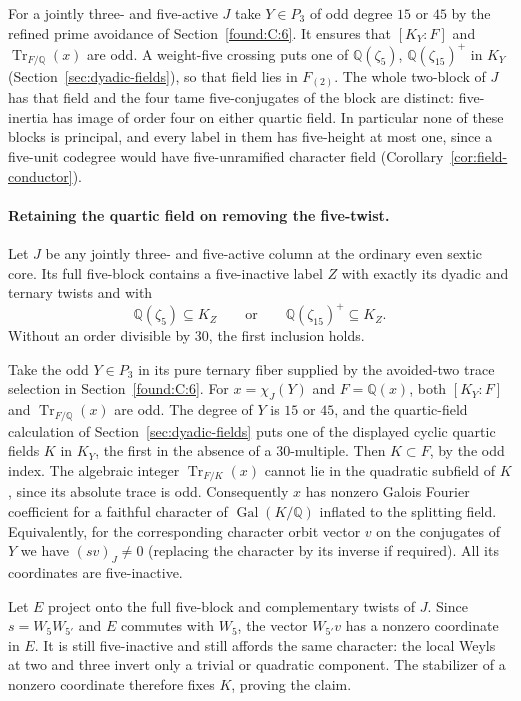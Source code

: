 \documentclass[11pt,a4paper]{article}
\numberwithin{equation}{section}
\theoremstyle{remark}
\newcommand{\QQ}{\mathbb Q}
\begin{document}
For a jointly three- and five-active $J$ take $Y\in P_3$ of odd
degree $15$ or $45$ by the refined prime avoidance of Section~\ref{found:C:6}.
It ensures that $[K_Y:F]$ and $\operatorname{Tr}_{F/\QQ}(x)$
are odd. A weight-five crossing puts one of $\QQ(\zeta_5)$,
$\QQ(\zeta_{15})^+$ in $K_Y$ (Section~\ref{sec:dyadic-fields}), so that field lies
in $F_{(2)}$. The whole two-block of $J$ has that field and the
four tame five-conjugates of the block are distinct: five-inertia
has image of order four on either quartic field. In particular none
of these blocks is principal, and every label in them has five-height
at most one, since a five-unit codegree would have five-unramified
character field (Corollary~\ref{cor:field-conductor}).

\paragraph{Retaining the quartic field on removing the five-twist.}
Let $J$ be any jointly three- and five-active column at the ordinary
even sextic core. Its full five-block contains a five-inactive label
$Z$ with exactly its dyadic and ternary twists and with
\[
  \mathbb Q(\zeta_5)\subseteq K_Z\qquad\text{or}\qquad
  \mathbb Q(\zeta_{15})^+\subseteq K_Z.
\]
Without an order divisible by $30$, the first inclusion holds.

Take the odd $Y\in P_3$ in its pure ternary fiber supplied by the avoided-two trace selection in Section~\ref{found:C:6}. For
$x=\chi_J(Y)$ and $F=\mathbb Q(x)$, both $[K_Y:F]$ and
$\operatorname{Tr}_{F/\mathbb Q}(x)$ are odd.
The degree of $Y$ is $15$ or $45$, and the quartic-field calculation
of Section~\ref{sec:dyadic-fields} puts one of the displayed cyclic quartic
fields $K$ in $K_Y$, the first in the absence of a $30$-multiple.
Then $K\subset F$, by the odd index. The algebraic integer
$\operatorname{Tr}_{F/K}(x)$ cannot lie in the quadratic subfield
of $K$, since its absolute trace is odd. Consequently $x$ has
nonzero Galois Fourier coefficient for a faithful character of
$\operatorname{Gal}(K/\mathbb Q)$ inflated to the splitting field.
Equivalently, for the corresponding character orbit vector $v$
on the conjugates of $Y$ we have $(sv)_J\ne0$ (replacing the
character by its inverse if required). All its coordinates are
five-inactive.

Let $E$ project onto the full five-block and complementary twists
of $J$. Since $s=W_5W_{5'}$ and $E$ commutes with $W_5$, the
vector $W_{5'}v$ has a nonzero coordinate in $E$. It is still
five-inactive and still affords the same character: the local
Weyls at two and three invert only a trivial or quadratic
component. The stabilizer of a nonzero coordinate therefore fixes
$K$, proving the claim.
\end{document}
